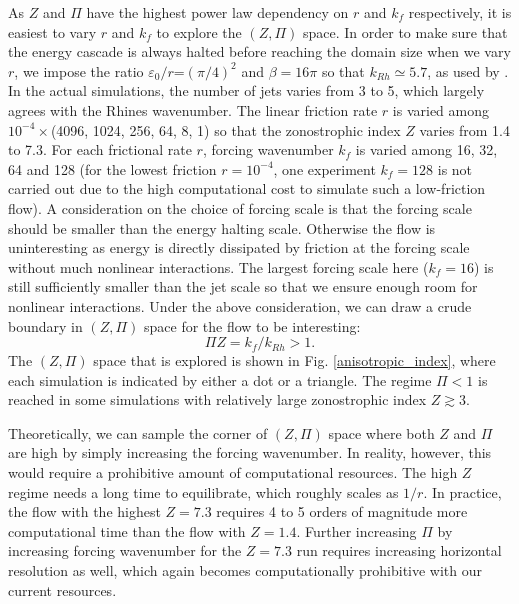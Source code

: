 \documentclass{jfm}
\begin{document}
As $Z$ and $\Pi$ have the highest power law dependency on $r$ and
$k_{f}$ respectively, it is easiest to vary $r$ and $k_{f}$ to
explore the $(Z,\Pi)$ space. In order to make sure that the energy cascade is
always halted before reaching the domain size when we vary $r$, we impose
the ratio $\varepsilon_{0}/r$=$(\pi/4)^{2}$ and $\beta=16\pi$ so
that $k_{Rh}\simeq5.7$, as used by \citet{Scott2012}. In
the actual simulations, the number of jets varies from 3 to 5, which
largely agrees with the Rhines wavenumber. The linear friction rate
$r$ is varied among $10^{-4}\times$(4096, 1024, 256, 64, 8, 1) so
that the zonostrophic index $Z$ varies from 1.4 to 7.3. For each frictional
rate $r$, forcing wavenumber $k_{f}$ is varied among 16, 32, 64
and 128 (for the lowest friction $r=10^{-4}$, one experiment $k_{f}=128$
is not carried out due to the high computational cost to simulate
such a low-friction flow). A consideration
on the choice of forcing scale is that the forcing scale should be
smaller than the energy halting scale. Otherwise the flow is
uninteresting as energy is directly dissipated by friction at the
forcing scale without much nonlinear interactions.
The largest forcing scale here ($k_{f}=16$) is
still sufficiently smaller than the jet scale so that we ensure
enough room for nonlinear interactions. Under the above consideration,
we can draw a crude boundary in $(Z,\Pi)$ space
for the flow to be interesting:
\begin{equation}
\Pi Z=k_{f}/k_{Rh}>1.\label{eq:PIxZ>1}
\end{equation}
The $(Z,\Pi)$ space that is explored is shown in Fig. \ref{anisotropic_index},
where each simulation is indicated by either a dot or a triangle. The
regime $\Pi<1$ is reached in some simulations with relatively large
zonostrophic index $Z\apprge3$. 

Theoretically, we can sample the corner of $(Z,\Pi)$ space where
both $Z$ and $\Pi$ are high by simply increasing the forcing wavenumber.
In reality, however, this would require a prohibitive amount of computational
resources. The high $Z$ regime needs a long time to equilibrate, which roughly scales as $1/r$. 
In practice, the flow with the highest $Z=7.3$ requires 4 to 5 orders of magnitude
more computational time than the flow with $Z=1.4$. Further increasing $\Pi$ by increasing
forcing wavenumber for the $Z=7.3$ run requires increasing horizontal
resolution as well, which again becomes computationally prohibitive with
our current resources.
\end{document}
